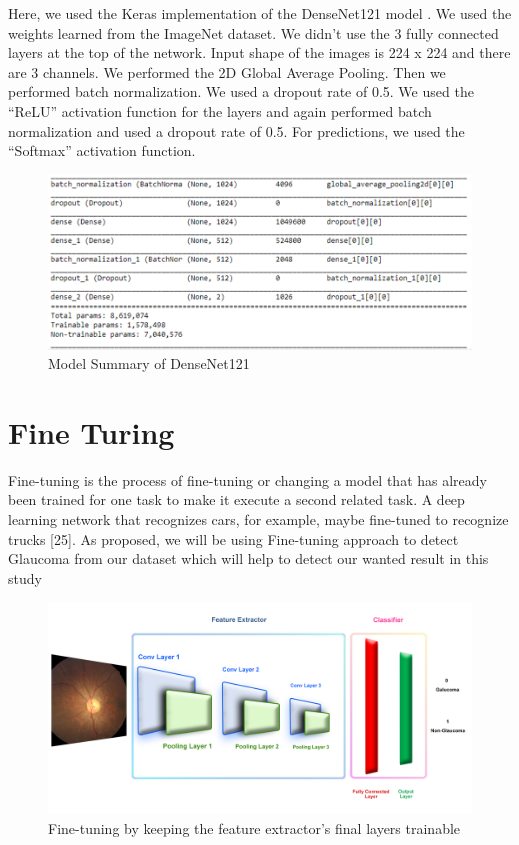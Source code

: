 \vspace{5mm}
Here, we used the Keras implementation of the DenseNet121 model . We used the weights learned from the ImageNet dataset. We didn’t use the 3 fully connected layers at the top of the network. Input shape of the images is 224 x 224 and there are 3 channels. We performed  the 2D Global Average Pooling. Then we performed batch normalization. We used a dropout rate of 0.5. We used the “ReLU” activation function for the layers and again performed batch normalization and used a dropout rate of 0.5. For predictions, we used the “Softmax” activation function.

\vspace{5mm}
\begin{figure}[hbt!]
\centering
\includegraphics[scale=1]{images/fig-15.png}
\caption{Model Summary of DenseNet121}
\label{fig:x Model Summary of DenseNet121}
\end{figure}

\section{Fine Turing}
Fine-tuning is the process of fine-tuning or changing a model that has already been trained for one task to make it execute a second related task. A deep learning network that recognizes cars, for example, maybe fine-tuned to recognize trucks [25]. As proposed, we will be using Fine-tuning approach to detect Glaucoma from our dataset which will help to detect our wanted result in this study

\vspace{5mm}
\begin{figure}[hbt!]
\centering
\includegraphics[scale=0.5]{images/Fine-tuning by keeping the feature extractor_s final layers trainable.png}
\caption{Fine-tuning by keeping the feature extractor's final layers trainable}
\label{fig:x Fine-tuning by keeping the feature extractor's final layers trainable}
\end{figure}

